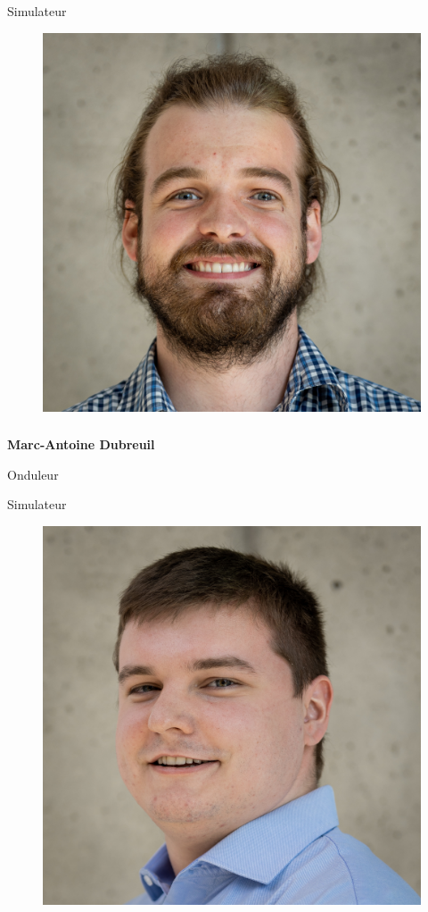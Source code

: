\documentclass[a0paper,portrait]{baposter}
\begin{document}
\begin{poster}
{Simulateur

\begin{figure}
\includegraphics[width=.9\linewidth]{img/membres/Marc-Antoine-Dubreuil-2.jpg} 
\end{figure}
\subsubsection*{}
\textbf{Marc-Antoine Dubreuil}

Onduleur

Simulateur

\begin{figure}
\includegraphics[width=.9\linewidth]{img/membres/Thomas-Chagnon-3.jpg} 
\end{figure}
}
\end{poster}
\end{document}

